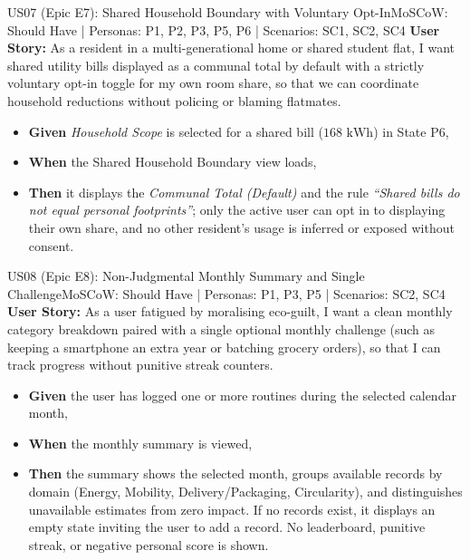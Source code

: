\documentclass[12pt,a4paper]{article}
\begin{document}
\begin{storybox}{US07 (Epic E7): Shared Household Boundary with Voluntary Opt-In}{MoSCoW: Should Have | Personas: P1, P2, P3, P5, P6 | Scenarios: SC1, SC2, SC4}
\textbf{User Story:} As a resident in a multi-generational home or shared student flat, I want shared utility bills displayed as a communal total by default with a strictly voluntary opt-in toggle for my own room share, so that we can coordinate household reductions without policing or blaming flatmates.
\begin{itemize}
    \item \textbf{Given} \textit{Household Scope} is selected for a shared bill ($168\text{ kWh}$) in State P6,
    \item \textbf{When} the Shared Household Boundary view loads,
    \item \textbf{Then} it displays the \textit{Communal Total (Default)} and the rule \textit{``Shared bills do not equal personal footprints''}; only the active user can opt in to displaying their own share, and no other resident's usage is inferred or exposed without consent.
\end{itemize}
\end{storybox}

\begin{storybox}{US08 (Epic E8): Non-Judgmental Monthly Summary and Single Challenge}{MoSCoW: Should Have | Personas: P1, P3, P5 | Scenarios: SC2, SC4}
\textbf{User Story:} As a user fatigued by moralising eco-guilt, I want a clean monthly category breakdown paired with a single optional monthly challenge (such as keeping a smartphone an extra year or batching grocery orders), so that I can track progress without punitive streak counters.
\begin{itemize}
    \item \textbf{Given} the user has logged one or more routines during the selected calendar month,
    \item \textbf{When} the monthly summary is viewed,
    \item \textbf{Then} the summary shows the selected month, groups available records by domain (Energy, Mobility, Delivery/Packaging, Circularity), and distinguishes unavailable estimates from zero impact. If no records exist, it displays an empty state inviting the user to add a record. No leaderboard, punitive streak, or negative personal score is shown.
\end{itemize}
\end{storybox}
\end{document}
